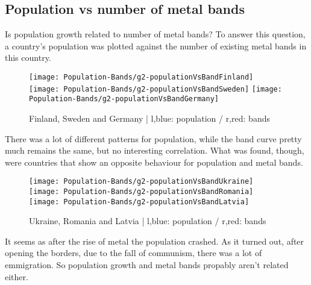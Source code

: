 \subsection{Population vs number of metal bands}
Is population growth related to number of metal bands? To answer this question, a country's population was plotted against the number of existing metal bands in this country.
\begin{figure}[ht!]
	\texttt{[image: Population-Bands/g2-populationVsBandFinland]}
	\centering
	\texttt{[image: Population-Bands/g2-populationVsBandSweden]}
	\texttt{[image: Population-Bands/g2-populationVsBandGermany]}
	\caption{Finland, Sweden and Germany | l,blue: population / r,red: bands}
\end{figure}
There was a lot of different patterns for population, while the band curve pretty much remains the same, but no interesting correlation. What was found, though, were countries that show an opposite behaviour for population and metal bands.
\begin{figure}[hbt!]
	\texttt{[image: Population-Bands/g2-populationVsBandUkraine]}
	\centering
	\texttt{[image: Population-Bands/g2-populationVsBandRomania]}
	\texttt{[image: Population-Bands/g2-populationVsBandLatvia]}
	\caption{Ukraine, Romania and Latvia | l,blue: population / r,red: bands}
\end{figure}
It seems as after the rise of metal the population crashed. As it turned out, after opening the borders, due to the fall of communism, there was a lot of emmigration. So population growth and metal bands propably aren't related either.

